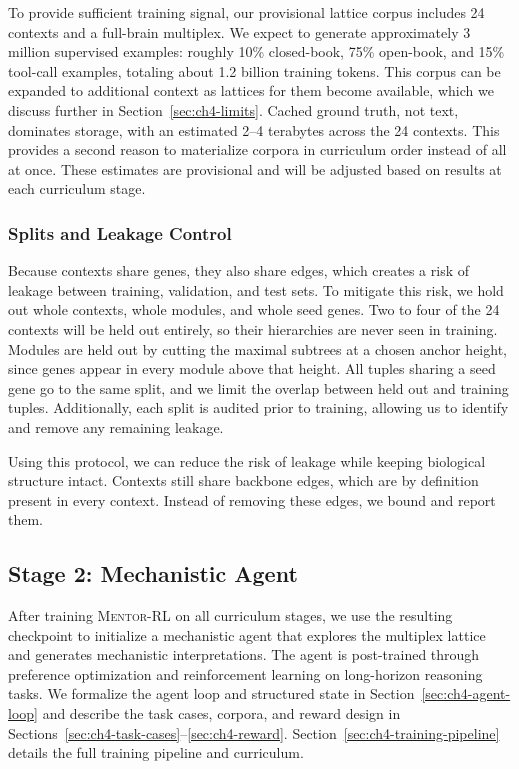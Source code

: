 To provide sufficient training signal, our provisional lattice corpus includes 24 contexts and a full-brain multiplex. We expect to generate approximately 3 million supervised examples: roughly 10\% closed-book, 75\% open-book, and 15\% tool-call examples, totaling about 1.2 billion training tokens. This corpus can be expanded to additional context as lattices for them become available, which we discuss further in Section~\ref{sec:ch4-limits}. Cached ground truth, not text, dominates storage, with an estimated 2--4 terabytes across the 24 contexts. This provides a second reason to materialize corpora in curriculum order instead of all at once. These estimates are provisional and will be adjusted based on results at each curriculum stage.

\subsubsection{Splits and Leakage Control}\label{sec:ch4-splits}
Because contexts share genes, they also share edges, which creates a risk of leakage between training, validation, and test sets. To mitigate this risk, we hold out whole contexts, whole modules, and whole seed genes. Two to four of the 24 contexts will be held out entirely, so their hierarchies are never seen in training. Modules are held out by cutting the maximal subtrees at a chosen anchor height, since genes appear in every module above that height. All tuples sharing a seed gene go to the same split, and we limit the overlap between held out and training tuples. Additionally, each split is audited prior to training, allowing us to identify and remove any remaining leakage.

Using this protocol, we can reduce the risk of leakage while keeping biological structure intact. Contexts still share backbone edges, which are by definition present in every context. Instead of removing these edges, we bound and report them.

\subsection{Stage 2: Mechanistic Agent}\label{sec:ch4-stage2}
After training \textsc{Mentor-RL} on all curriculum stages, we use the resulting checkpoint to initialize a mechanistic agent that explores the multiplex lattice and generates mechanistic interpretations. The agent is post-trained through preference optimization and reinforcement learning on long-horizon reasoning tasks. We formalize the agent loop and structured state in Section~\ref{sec:ch4-agent-loop} and describe the task cases, corpora, and reward design in Sections~\ref{sec:ch4-task-cases}--\ref{sec:ch4-reward}. Section~\ref{sec:ch4-training-pipeline} details the full training pipeline and curriculum.

